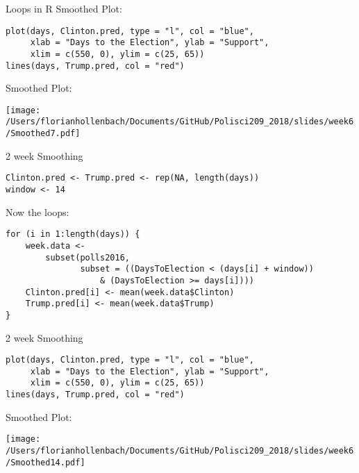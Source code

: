 \documentclass[presentation]{beamer}
\begin{document}
\begin{frame}[fragile,label={sec:orge005838}]{Loops in R}
 Smoothed Plot:
\begin{verbatim}
plot(days, Clinton.pred, type = "l", col = "blue",
     xlab = "Days to the Election", ylab = "Support",
     xlim = c(550, 0), ylim = c(25, 65))
lines(days, Trump.pred, col = "red")
\end{verbatim}
\end{frame}


\begin{frame}[label={sec:org451f0ba}]{Smoothed Plot:}
\begin{center}
\texttt{[image: /Users/florianhollenbach/Documents/GitHub/Polisci209\_2018/slides/week6/Smoothed7.pdf]}
\end{center}
\end{frame}



\begin{frame}[fragile,shrink=25,label={sec:org8e5753f}]{2 week Smoothing}
 \begin{verbatim}
Clinton.pred <- Trump.pred <- rep(NA, length(days))
window <- 14

\end{verbatim}
\pause


Now the loops:
\begin{verbatim}
for (i in 1:length(days)) {
    week.data <-
        subset(polls2016,
               subset = ((DaysToElection < (days[i] + window))
                   & (DaysToElection >= days[i])))
    Clinton.pred[i] <- mean(week.data$Clinton)
    Trump.pred[i] <- mean(week.data$Trump)
}
\end{verbatim}
\end{frame}

\begin{frame}[fragile,label={sec:orga15fce0}]{2 week Smoothing}
 \begin{verbatim}
plot(days, Clinton.pred, type = "l", col = "blue",
     xlab = "Days to the Election", ylab = "Support",
     xlim = c(550, 0), ylim = c(25, 65))
lines(days, Trump.pred, col = "red")
\end{verbatim}
\end{frame}


\begin{frame}[label={sec:orgfecb89b}]{Smoothed Plot:}
\begin{center}
\texttt{[image: /Users/florianhollenbach/Documents/GitHub/Polisci209\_2018/slides/week6/Smoothed14.pdf]}
\end{center}
\end{frame}
\end{document}
